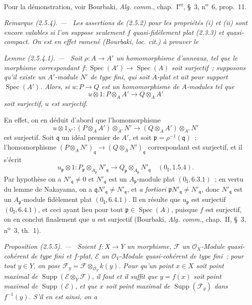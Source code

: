\documentclass[10pt,oneside]{book}
\newenvironment{proposition}[1][]{%
  \par\medskip\noindent\itshape Proposition (#1). ---\ }{\par}
\newenvironment{remark}[1][]{%
  \par\medskip\noindent\itshape Remarque (#1). ---\ }{\par}
\newenvironment{lemma}[1][]{%
  \par\medskip\noindent\itshape Lemme (#1). ---\ }{\par}
\begin{document}
Pour la démonstration, voir Bourbaki, \emph{Alg. comm.},
chap.~I\textsuperscript{er}, \S~3, n\textsuperscript{o}~6, prop.~11.

\begin{remark}[2.5.4]
\label{IV.2.5.4-fr}
Les assertions de (2.5.2) pour les propriétés (i) et (ii) sont encore
valables si l'on suppose seulement $f$ quasi-fidèlement plat (2.3.3) et
quasi-compact. On est en effet ramené (Bourbaki, \emph{loc. cit.}) à prouver
le
\end{remark}

\begin{lemma}[2.5.4.1]
\label{IV.2.5.4.1-fr}
Soit $\rho:A\to A'$ un homomorphisme d'anneaux, tel que le morphisme
correspondant $f:\operatorname{Spec}(A')\to\operatorname{Spec}(A)$ soit
surjectif~; supposons qu'il existe un $A'$-module $N'$ de type fini, qui soit
$A$-plat et ait pour support $\operatorname{Spec}(A')$. Alors, si
$u:P\to Q$ est un homomorphisme de $A$-modules tel que
\[
u\otimes 1:P\otimes_A A'\longrightarrow Q\otimes_A A'
\]
soit surjectif, $u$ est surjectif.
\end{lemma}

En effet, on en déduit d'abord que l'homomorphisme
\[
u\otimes 1_{N'}:(P\otimes_A A')\otimes_{A'}N'
\longrightarrow(Q\otimes_A A')\otimes_{A'}N'
\]
est surjectif. Soit $\mathfrak q$ un idéal premier de $A'$, et soit
$\mathfrak p=\rho^{-1}(\mathfrak q)$~; l'homomorphisme
$(P\otimes_A N')_{\mathfrak q}\to(Q\otimes_A N')_{\mathfrak q}$
correspondant est surjectif, et il s'écrit
\[
u_{\mathfrak p}\otimes 1:
P_{\mathfrak p}\otimes_{A_{\mathfrak p}}N'_{\mathfrak q}
\longrightarrow
Q_{\mathfrak p}\otimes_{A_{\mathfrak p}}N'_{\mathfrak q}
\quad(0_{\mathrm I},1.5.4).
\]
Par hypothèse on a $N'_{\mathfrak q}\ne0$ et $N'_{\mathfrak q}$ est un
$A_{\mathfrak p}$-module plat $(0_{\mathrm I},6.3.1)$~; en vertu du lemme de
Nakayama, on a
$\mathfrak qN'_{\mathfrak q}\ne N'_{\mathfrak q}$, et \emph{a fortiori}
$\mathfrak pN'_{\mathfrak q}\ne N'_{\mathfrak q}$, donc
$N'_{\mathfrak q}$ est un $A_{\mathfrak p}$-module fidèlement plat
$(0_{\mathrm I},6.4.1)$. Il en résulte que $u_{\mathfrak p}$ est surjectif
$(0_{\mathrm I},6.4.1)$, et ceci ayant lieu pour tout
$\mathfrak p\in\operatorname{Spec}(A)$, puisque $f$ est surjectif, on en
conclut finalement que $u$ est surjectif (Bourbaki, \emph{Alg. comm.},
chap.~II, \S~3, n\textsuperscript{o}~3, th.~1).

\begin{proposition}[2.5.5]
\label{IV.2.5.5-fr}
Soient $f:X\to Y$ un morphisme, $\mathscr F$ un $\mathcal O_X$-Module
quasi-cohérent de type fini et $f$-plat, $\mathscr E$ un
$\mathcal O_Y$-Module quasi-cohérent de type fini~; pour tout $y\in Y$, on
pose $\mathscr F_y=\mathscr F\otimes_{\mathcal O_Y}k(y)$. Pour qu'un point
$x\in X$ soit point maximal de
$\operatorname{Supp}(\mathscr E\otimes_Y\mathscr F)$, il faut et il suffit que
$y=f(x)$ soit point maximal de $\operatorname{Supp}(\mathscr E)$, et que $x$
soit point maximal de $\operatorname{Supp}(\mathscr F_y)$ dans $f^{-1}(y)$.
S'il en est ainsi, on a
\end{proposition}
\end{document}
